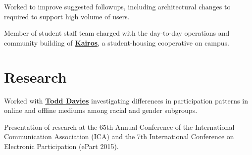 \documentclass[letterpaper]{deedy-resume} %
\begin{document}
\begin{minipage}[t]{0.66\textwidth}
\begin{tightitemize}
\item Worked to improve suggested followups, including architectural changes to required to support high volume of users.
\end{tightitemize}

\sectionspace %



\begin{tightitemize}
\item Member of student staff team charged with the day-to-day operations and community building of \textbf{\href{http://web.stanford.edu/group/kairos/}{Kairos}}, a student-housing cooperative on campus. 


\end{tightitemize}

\sectionspace %






\section{Research}


\begin{tightitemize}
\item Worked with \textbf{\href{http://www.web.stanford.edu/~davies/}{Todd Davies}} investigating differences in participation patterns in online and offline mediums among racial and gender subgroups. 
\item Presentation of research at the 65th Annual Conference of the International Communication Association (ICA) and the 7th International Conference on Electronic Participation (ePart 2015).
\end{tightitemize}


\end{minipage}
\end{document}

